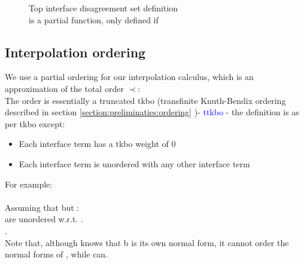 \begin{figure}

\bigskip

\noindent
{}
\caption{Top interface disagreement set definition\\
 is a partial function, only defined if 
}
\label{idasg_def}
\end{figure}

\subsection{Interpolation ordering}
We use a partial ordering \m{\textcolor{blue}{\prec_i}} for our interpolation calculus, which is an approximation of the total order $\prec$:\\
The order is essentially a truncated tkbo (transfinite Knuth-Bendix ordering described in section \ref{section:preliminaties:ordering} )- \textcolor{blue}{ttkbo} - the definition is as per tkbo except:
\begin{itemize}
	\item Each interface term has a tkbo weight of 0
	\item Each interface term is unordered with any other interface term
\end{itemize}

\noindent
For example:\\
\\
Assuming that \m{\textcolor{red}{y} \succ \textcolor{red}{x}} but :\\
 are unordered w.r.t. .\\
.\\
Note that, although  knows that b is its own normal form, it cannot order the normal forms of , 
while  can.

